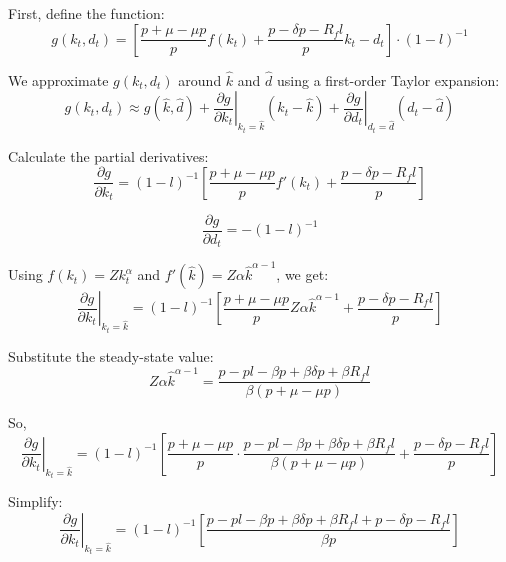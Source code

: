 \documentclass[12pt]{report}
\begin{document}
First, define the function:
\begin{equation}
g(k_t, d_t) = \left[ \frac{p + \mu - \mu p}{p} f(k_{t}) + \frac{p - \delta p - R_f l}{p} k_{t} - d_{t} \right] \cdot \left(1-l\right)^{-1}
\end{equation}

We approximate \( g(k_t, d_t) \) around \( \hat{k} \) and \( \hat{d} \) using a first-order Taylor expansion:
\begin{equation}
g(k_t, d_t) \approx g(\hat{k}, \hat{d}) + \left. \frac{\partial g}{\partial k_t} \right|_{k_t = \hat{k}} (k_t - \hat{k}) + \left. \frac{\partial g}{\partial d_t} \right|_{d_t = \hat{d}} (d_t - \hat{d})
\end{equation}

Calculate the partial derivatives:
\begin{equation}
\frac{\partial g}{\partial k_t} = \left(1-l\right)^{-1} \left[ \frac{p + \mu - \mu p}{p} f'(k_t) + \frac{p - \delta p - R_f l}{p} \right]
\end{equation}

\begin{equation}
\frac{\partial g}{\partial d_t} = -\left(1-l\right)^{-1}
\end{equation}

Using \( f(k_t) = Z k_t^\alpha \) and \( f'(\hat{k}) = Z \alpha \hat{k}^{\alpha-1} \), we get:
\begin{equation}
\left. \frac{\partial g}{\partial k_t} \right|_{k_t = \hat{k}} = \left(1-l\right)^{-1} \left[ \frac{p + \mu - \mu p}{p} Z \alpha \hat{k}^{\alpha-1} + \frac{p - \delta p - R_f l}{p} \right]
\end{equation}

Substitute the steady-state value:
\begin{equation}
Z \alpha \hat{k}^{\alpha-1} = \frac{p - p l - \beta p + \beta \delta p + \beta R_f l}{\beta \left(p + \mu - \mu p\right)}
\end{equation}

So,
\begin{equation}
\left. \frac{\partial g}{\partial k_t} \right|_{k_t = \hat{k}} = \left(1-l\right)^{-1} \left[ \frac{p + \mu - \mu p}{p} \cdot \frac{p - p l - \beta p + \beta \delta p + \beta R_f l}{\beta \left(p + \mu - \mu p\right)} + \frac{p - \delta p - R_f l}{p} \right]
\end{equation}

Simplify:
\begin{equation}
\left. \frac{\partial g}{\partial k_t} \right|_{k_t = \hat{k}} = \left(1-l\right)^{-1} \left[ \frac{p - p l - \beta p + \beta \delta p + \beta R_f l + p - \delta p - R_f l}{\beta p} \right]
\end{equation}
\end{document}
